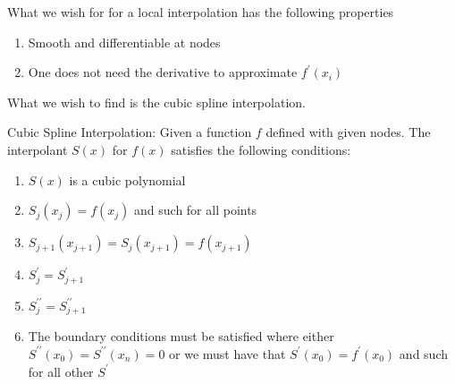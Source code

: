 What we wish for for a local interpolation has the following properties
\begin{enumerate}
    \item Smooth and differentiable at nodes
    \item One does not need the derivative to approximate \(f^{\prime} (x_i)\) 
\end{enumerate}
What we wish to find is the cubic spline interpolation. 
\begin{definition}
    Cubic Spline Interpolation: Given a function \(f\) defined with given nodes. The interpolant
    \(S(x)\) for \(f(x)\) satisfies the following conditions:
    \begin{enumerate}
        \item \(S(x)\) is a cubic polynomial 
        \item \(S_j (x_j) = f(x_j)\) and such for all points
        \item \(S_{j+1} (x_{j+1}) = S_j (x_{j+1} ) = f(x_{j+1} )\) 
        \item \(S^{\prime}_j = S^{\prime}_{j+1} \) 
        \item \(S_j ^{\prime\prime} = S_{j+1} ^{\prime\prime} \)
        \item The boundary conditions must be satisfied where either \(S^{\prime\prime} (x_0) = S^{\prime\prime} (x_n) = 0\)  or we must have that \(S^{\prime} (x_0) = f^{\prime} (x_0)\) and such for all other \(S^{\prime} \)  
    \end{enumerate}
\end{definition}

